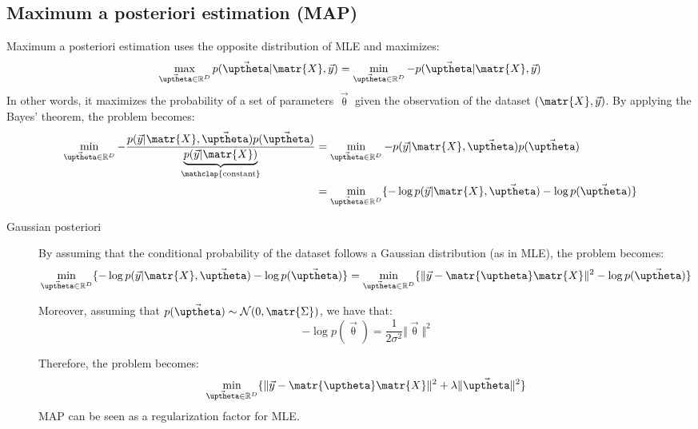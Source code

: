 \subsection{Maximum a posteriori estimation (MAP)}
Maximum a posteriori estimation uses the opposite distribution of MLE and maximizes:
\[ 
    \max_{\vec{\uptheta} \in \mathbb{R}^D} p(\vec{\uptheta} \vert \matr{X}, \vec{y}) =
    \min_{\vec{\uptheta} \in \mathbb{R}^D} -p(\vec{\uptheta} \vert \matr{X}, \vec{y})
\]
In other words, it maximizes the probability of a set of parameters $\vec{\uptheta}$ given the observation of the dataset $(\matr{X}, \vec{y})$.
By applying the Bayes' theorem, the problem becomes:
\[ 
    \begin{split}
        \min_{\vec{\uptheta} \in \mathbb{R}^D} 
            -\frac{p(\vec{y} \vert \matr{X}, \vec{\uptheta}) p(\vec{\uptheta})}{\underbrace{p(\vec{y} \vert \matr{X})}_{\mathclap{\text{constant}}}} &=
        \min_{\vec{\uptheta} \in \mathbb{R}^D} -p(\vec{y} \vert \matr{X}, \vec{\uptheta}) p(\vec{\uptheta}) \\
        &= \min_{\vec{\uptheta} \in \mathbb{R}^D} \{ -\log p(\vec{y} \vert \matr{X}, \vec{\uptheta}) -\log p(\vec{\uptheta}) \}
    \end{split}
\]

\begin{description}
    \item[Gaussian posteriori] 
        By assuming that the conditional probability of the dataset follows a Gaussian distribution (as in MLE),
        the problem becomes:
        \[ 
            \min_{\vec{\uptheta} \in \mathbb{R}^D} \{ -\log p(\vec{y} \vert \matr{X}, \vec{\uptheta}) -\log p(\vec{\uptheta}) \} = 
            \min_{\vec{\uptheta} \in \mathbb{R}^D} \{ \Vert \vec{y} - \matr{\uptheta}\matr{X} \Vert^2 -\log p(\vec{\uptheta}) \} 
        \]

        Moreover, assuming that $p(\vec{\uptheta}) \sim \mathcal{N}(0, \matr{\Sigma})$, we have that:
        \[ -\log p(\vec{\uptheta}) = \frac{1}{2\sigma^2} \Vert \vec{\uptheta} \Vert^2 \]

        Therefore, the problem becomes:
        \[ \min_{\vec{\uptheta} \in \mathbb{R}^D} \{ \Vert \vec{y} - \matr{\uptheta}\matr{X} \Vert^2 + \lambda \Vert \vec{\uptheta} \Vert^2 \} \]
        MAP can be seen as a regularization factor for MLE.
\end{description}



